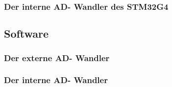 \subsubsection{Der interne AD- Wandler des STM32G4}
\label{subsubsec:internal-adc}

\subsection{Software}
\label{subsec:hardware}

\subsubsection{Der externe AD- Wandler}
\label{subsubsec:external-adc}

\subsubsection{Der interne AD- Wandler}
\label{subsubsec:internal-adc}